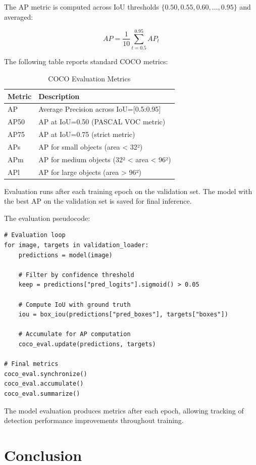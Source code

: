 \documentclass[12pt,a4paper]{article}
\begin{document}
The AP metric is computed across IoU thresholds $\{0.50, 0.55, 0.60, \ldots, 0.95\}$ and averaged:

\begin{equation}
AP = \frac{1}{10} \sum_{t=0.5}^{0.95} AP_t
\end{equation}

The following table reports standard COCO metrics:

\begin{table}[htbp]
\centering
\caption{COCO Evaluation Metrics}
\label{tab:metrics}
\begin{tabular}{ll}
\toprule
\textbf{Metric} & \textbf{Description} \\
\midrule
AP & Average Precision across IoU=[0.5:0.95] \\
AP50 & AP at IoU=0.50 (PASCAL VOC metric) \\
AP75 & AP at IoU=0.75 (strict metric) \\
APs & AP for small objects (area < 32²) \\
APm & AP for medium objects (32² < area < 96²) \\
APl & AP for large objects (area > 96²) \\
\bottomrule
\end{tabular}
\end{table}

Evaluation runs after each training epoch on the validation set. The model with the best AP on the validation set is saved for final inference.

The evaluation pseudocode:

\begin{verbatim}
# Evaluation loop
for image, targets in validation_loader:
    predictions = model(image)
    
    # Filter by confidence threshold
    keep = predictions["pred_logits"].sigmoid() > 0.05
    
    # Compute IoU with ground truth
    iou = box_iou(predictions["pred_boxes"], targets["boxes"])
    
    # Accumulate for AP computation
    coco_eval.update(predictions, targets)

# Final metrics
coco_eval.synchronize()
coco_eval.accumulate()
coco_eval.summarize()
\end{verbatim}

The model evaluation produces metrics after each epoch, allowing tracking of detection performance improvements throughout training.

\section{Conclusion}
\end{document}
